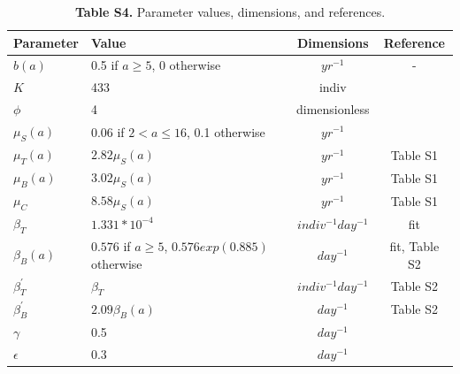 \documentclass[11pt]{article}
\begin{document}
\begin{table} %
\caption*{ \textbf{Table S4.} Parameter values, dimensions, and references.}
\newcommand{\head}[1]{\textnormal{\textbf{#1}}}
\small
\begin{tabular}{llcc} %
\hline
\head{Parameter} & \head{Value} & \head{Dimensions} & \head{Reference}\\*
\hline
$b(a)$ & 0.5 if $a \geq 5$, 0 otherwise & $yr^{-1}$ & - \\*
$K $& 433 & indiv & \cite{cross_assessing_2006} \\*
$\phi $& 4 & dimensionless & \cite{cross_assessing_2006} \\* 
$\mu_S(a) $& 0.06 if $2 < a \leq 16$, 0.1 otherwise & $yr^{-1}$ & \cite{cross_assessing_2006, jolles_hidden_2005} \\* 
$\mu_T(a) $& $2.82 \mu_S(a)$ & $yr^{-1}$ & Table S1 \\* 
$\mu_B(a) $& $3.02 \mu_S(a)$ & $yr^{-1}$ & Table S1 \\ 
$\mu_C$ & $8.58 \mu_S(a)$ & $yr^{-1}$ & Table S1 \\ 
$\beta_T $ & $1.331 * 10 ^{-4}$ & $indiv^{-1}day^{-1}$ & fit \\
$\beta_B(a)$ & $0.576$ if $a\geq 5$, $0.576 exp(0.885)$ otherwise & $day^{-1}$ & fit, Table S2 \\
$\beta_{T}^{'}$  & $\beta_T$ & $indiv^{-1}day^{-1}$ & Table S2 \\
$\beta_{B}^{'}$  & $2.09 \beta_{B}(a)$ & $day^{-1}$ & Table S2 \\
$\gamma$& 0.5 & $day^{-1}$ & \cite{rhyan_pathogenesis_2009} \\
$\epsilon$& 0.3 & $day^{-1}$ & \cite{hobbs_state-space_2015, treanor_vaccination_2010, ebinger_simulating_2011} \\
\hline 
\end{tabular}
\end{table} 

\pagebreak
\end{document}
